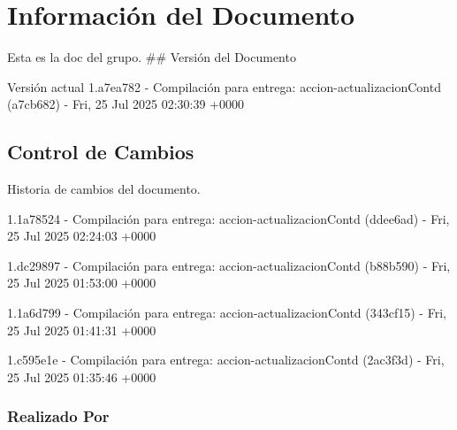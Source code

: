 \documentclass[
	a4paper, %
	12pt, %
]{include/CSSullivanBusinessReport}
\begin{document}
\newpage

\begin{twothirdswidth} %
	\tableofcontents %
\end{twothirdswidth}

\newpage


\newpage

\section{Información del
Documento}\label{sec:informaciuxf3n-del-documento}

Esta es la doc del grupo. \#\# Versión del Documento

\begin{quote}
\end{quote}

Versión actual 1.a7ea782 - Compilación para entrega:
accion-actualizacionContd (a7cb682) - Fri, 25 Jul 2025 02:30:39 +0000

\subsection{Control de Cambios}\label{sec:control-de-cambios}

Historia de cambios del documento.

1.1a78524 - Compilación para entrega: accion-actualizacionContd
(ddee6ad) - Fri, 25 Jul 2025 02:24:03 +0000

1.dc29897 - Compilación para entrega: accion-actualizacionContd
(b88b590) - Fri, 25 Jul 2025 01:53:00 +0000

1.1a6d799 - Compilación para entrega: accion-actualizacionContd
(343cf15) - Fri, 25 Jul 2025 01:41:31 +0000

1.c595e1e - Compilación para entrega: accion-actualizacionContd
(2ac3f3d) - Fri, 25 Jul 2025 01:35:46 +0000

\subsubsection{Realizado Por}\label{sec:realizado-por}
\end{document}
